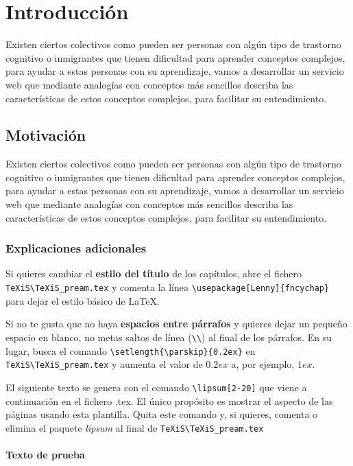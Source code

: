 \chapter{Introducción}
\label{cap:introduccion}


Existen ciertos colectivos como pueden ser personas con algún tipo de trastorno cognitivo o inmigrantes que tienen dificultad para aprender conceptos complejos, para ayudar a estas personas con su aprendizaje, vamos a desarrollar un servicio web que mediante analogías con conceptos más sencillos describa las características de estos conceptos complejos, para facilitar su entendimiento.
\section{Motivación}
Existen ciertos colectivos como pueden ser personas con algún tipo de trastorno cognitivo o inmigrantes que tienen dificultad para aprender conceptos complejos, para ayudar a estas personas con su aprendizaje, vamos a desarrollar un servicio web que mediante analogías con conceptos más sencillos describa las características de estos conceptos complejos, para facilitar su entendimiento.

\subsection{Explicaciones adicionales}
Si quieres cambiar el \textbf{estilo del título} de los capítulos, abre el fichero \verb|TeXiS\TeXiS_pream.tex| y comenta la línea \verb|\usepackage[Lenny]{fncychap}| para dejar el estilo básico de \LaTeX.

Si no te gusta que no haya \textbf{espacios entre párrafos} y quieres dejar un pequeño espacio en blanco, no metas saltos de línea (\verb|\\|) al final de los párrafos. En su lugar, busca el comando  \verb|\setlength{\parskip}{0.2ex}| en \verb|TeXiS\TeXiS_pream.tex| y aumenta el valor de $0.2ex$ a, por ejemplo, $1ex$.

El siguiente texto se genera con el comando \verb|\lipsum[2-20]| que viene a continuación en el fichero .tex. El único propósito es mostrar el aspecto de las páginas usando esta plantilla. Quita este comando y, si quieres, comenta o elimina el paquete \textit{lipsum} al final de \verb|TeXiS\TeXiS_pream.tex|

\subsubsection{Texto de prueba}


\lipsum[2-20]